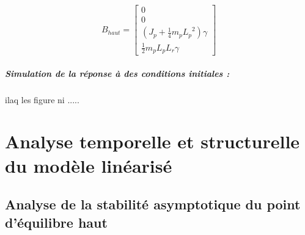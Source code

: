 \documentclass[12pt, a4paper, openany]{report}
\begin{document}
\begin{equation*}
    B_{haut} = \begin{bmatrix}
    0\\ 
    0\\ 
    (J_p+ \frac{1}{4}m_p{L_p}^2)\gamma\\ 
    \frac{1}{2}m_pL_pL_r\gamma
\end{bmatrix}
\end{equation*}


\paragraph{Simulation de la réponse à des conditions initiales :\\}


ilaq les figure ni .....







	
\chapter{Analyse temporelle et structurelle du modèle linéarisé }
\section{Analyse de la stabilité asymptotique du point d'équilibre haut}





 
 
\end{document}
